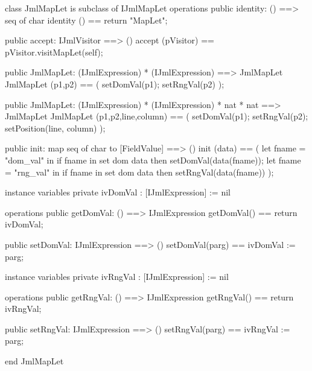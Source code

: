 \begin{vdm_al}
class JmlMapLet is subclass of IJmlMapLet
operations
  public identity: () ==> seq of char
  identity () == return "MapLet";

  public accept: IJmlVisitor ==> ()
  accept (pVisitor) == pVisitor.visitMapLet(self);

  public JmlMapLet:
    (IJmlExpression) *
    (IJmlExpression) ==> JmlMapLet
  JmlMapLet (p1,p2) == 
    ( setDomVal(p1);
      setRngVal(p2) );

  public JmlMapLet:
    (IJmlExpression) *
    (IJmlExpression) *
    nat *
    nat ==> JmlMapLet
  JmlMapLet (p1,p2,line,column) == 
    ( setDomVal(p1);
      setRngVal(p2);
      setPosition(line, column) );

  public init: map seq of char to [FieldValue] ==> ()
  init (data) ==
    ( let fname = "dom_val" in
        if fname in set dom data
        then setDomVal(data(fname));
      let fname = "rng_val" in
        if fname in set dom data
        then setRngVal(data(fname)) );

instance variables
  private ivDomVal : [IJmlExpression] := nil

operations
  public getDomVal: () ==> IJmlExpression
  getDomVal() == return ivDomVal;

  public setDomVal: IJmlExpression ==> ()
  setDomVal(parg) == ivDomVal := parg;

instance variables
  private ivRngVal : [IJmlExpression] := nil

operations
  public getRngVal: () ==> IJmlExpression
  getRngVal() == return ivRngVal;

  public setRngVal: IJmlExpression ==> ()
  setRngVal(parg) == ivRngVal := parg;

end JmlMapLet
\end{vdm_al}

